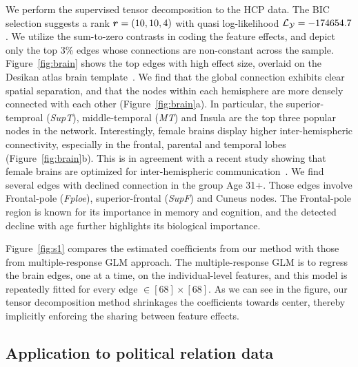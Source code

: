 \documentclass[12pt]{article}
\theoremstyle{definition}
\theoremstyle{definition}
\begin{document}
We perform the supervised tensor decomposition to the HCP data. %
The BIC selection suggests a rank $\bm{r}=(10,10,4)$ with quasi log-likelihood $\mathcal{L}_{\mathcal{Y}}=-174654.7$. We utilize the sum-to-zero contrasts in coding the feature effects, and depict only the top 3\% edges whose connections are non-constant across the sample. Figure~\ref{fig:brain} shows the top edges with high effect size, overlaid on the Desikan atlas brain template~\citep{desikan2006automated}. We find that the global connection exhibits clear spatial separation, and that the nodes within each hemisphere are more densely connected with each other (Figure~\ref{fig:brain}a). In particular, the superior-temproal (\emph{SupT}), middle-temporal (\emph{MT}) and Insula are the top three popular nodes in the network. Interestingly, female brains display higher inter-hemispheric connectivity, especially in the frontal, parental and temporal lobes (Figure~\ref{fig:brain}b). This is in agreement with a recent study showing that female brains are optimized for inter-hemispheric communication~\citep{ingalhalikar2014sex}. We find several edges with declined connection in the group Age 31+. Those edges involve Frontal-pole (\emph{Fploe}), superior-frontal (\emph{SupF}) and Cuneus nodes. The Frontal-pole region is known for its importance in memory and cognition, and the detected decline with age further highlights its biological importance. 



Figure~\ref{fig:s1} compares the estimated coefficients from our method with those from multiple-response GLM approach. The multiple-response GLM is to regress the brain edges, one at a time, on the individual-level features, and this model is repeatedly fitted for every edge $\in [68]\times [68]$. As we can see in the figure, our tensor decomposition method shrinkages the coefficients towards center, thereby implicitly enforcing the sharing between feature effects. 



\subsection{Application to political relation data}
\end{document}
